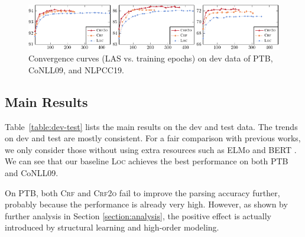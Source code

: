 



\begin{figure}[tb]
    \centering
    \includegraphics[width=\textwidth]{figures/convergency.pdf}
    \caption{
        Convergence curves (LAS vs. training epochs) on dev data of PTB, CoNLL09, and NLPCC19.
    }
    \label{fig:convergency}
\end{figure}

\subsection{Main Results}



Table~\ref{table:dev-test} lists the main results on the dev and test data.
The trends on dev and test are mostly consistent.
For a fair comparison with previous works, we only consider those without using extra resources such as ELMo \cite{peters-etal-2018-deep} and BERT \cite{devlin-etal-2019-bert}.
We can see that our baseline \textsc{Loc} achieves the best performance on both PTB and CoNLL09.


On PTB, both \textsc{Crf} and \textsc{Crf2o} fail to improve the parsing accuracy further,
probably because the performance is already very high.
However, as shown by further analysis in Section \ref{section:analysis},
the positive effect is actually introduced by structural learning and high-order modeling.


